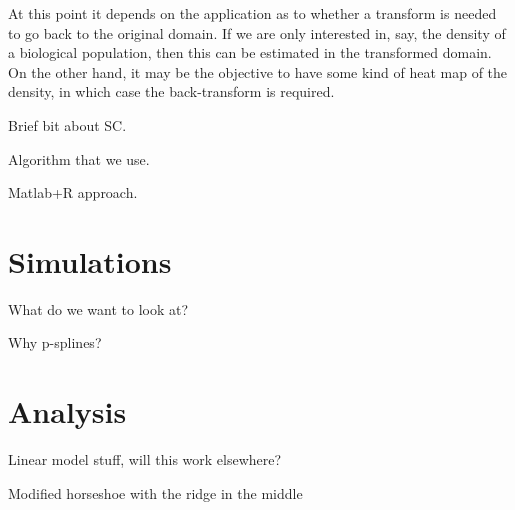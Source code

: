 \documentclass[a4paper,10pt]{amsart}
\begin{document}
At this point it depends on the application as to whether a transform is needed to go back to the original domain. If we are only interested in, say, the density of a biological population, then this can be estimated in the transformed domain. On the other hand, it may be the objective to have some kind of heat map of the density, in which case the back-transform is required.






Brief bit about SC.

Algorithm that we use.

Matlab+R approach.



\section{Simulations}

What do we want to look at?

Why p-splines?


\section{Analysis}


Linear model stuff, will this work elsewhere?





Modified horseshoe with the ridge in the middle










\end{document}
